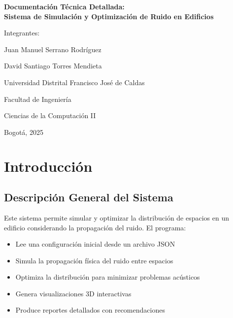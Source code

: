 \documentclass[a4paper,12pt]{article}
\begin{document}
\begin{titlepage}
    \centering
    
    {\large \bf Documentación Técnica Detallada:\\Sistema de Simulación y Optimización de Ruido en Edificios\par}
    \vspace{8cm} %
    
    {\Large Integrantes:\par}
    {\large Juan Manuel Serrano Rodríguez\par}
    {\large David Santiago Torres Mendieta\par}
    \vspace{6.5cm} %
    
    {\large Universidad Distrital Francisco José de Caldas\par}
    {\large Facultad de Ingeniería\par}
    {\large Ciencias de la Computación II\par}    
    {\large Bogotá, 2025\par}
    
    \vfill
\end{titlepage}

\tableofcontents

\newpage
\section{Introducción}
\subsection{Descripción General del Sistema}
Este sistema permite simular y optimizar la distribución de espacios en un edificio considerando la propagación del ruido. El programa:

\begin{itemize}
    \item Lee una configuración inicial desde un archivo JSON
    \item Simula la propagación física del ruido entre espacios
    \item Optimiza la distribución para minimizar problemas acústicos
    \item Genera visualizaciones 3D interactivas
    \item Produce reportes detallados con recomendaciones
\end{itemize}
\end{document}
